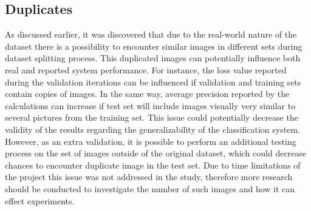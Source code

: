 \subsection{Duplicates}
As discussed earlier, it was discovered that due to the real-world nature of the dataset there is a possibility to encounter similar images in different sets during dataset splitting process. This duplicated images can potentially influence both real and reported system performance. For instance, the loss value reported during the validation iterations can be influenced if validation and training sets contain copies of images. In the same way, average precision reported by the calculations can increase if test set will include images visually very similar to several pictures from the training set. This issue could potentially decrease the validity of the results regarding the generalizability of the classification system. However, as an extra validation, it is possible to perform an additional testing process on the set of images outside of the original dataset, which could decrease chances to encounter duplicate image in the test set. Due to time limitations of the project this issue was not addressed in the study, therefore more research should be conducted to investigate the number of such images and how it can effect experiments.

